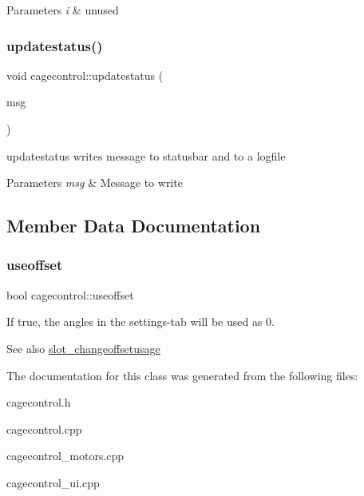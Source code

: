 \begin{DoxyParams}{Parameters}
{\em i} & unused \\
\hline
\end{DoxyParams}
\mbox{\label{classcagecontrol_aab3dedc2c4b814569988c93bd30546c7}} 
\subsubsection{\texorpdfstring{updatestatus()}{updatestatus()}}
{\footnotesize\ttfamily void cagecontrol\+::updatestatus (\begin{DoxyParamCaption}\item[{Q\+String}]{msg }\end{DoxyParamCaption})\hspace{0.3cm}{\ttfamily [private]}}



updatestatus writes message to statusbar and to a logfile 


\begin{DoxyParams}{Parameters}
{\em msg} & Message to write \\
\hline
\end{DoxyParams}


\subsection{Member Data Documentation}
\mbox{\label{classcagecontrol_aaae4d96e61ebe50baf65014003208ac0}} 
\subsubsection{\texorpdfstring{useoffset}{useoffset}}
{\footnotesize\ttfamily bool cagecontrol\+::useoffset\hspace{0.3cm}{\ttfamily [private]}}



If true, the angles in the settings-\/tab will be used as \textquotesingle{}0\textquotesingle{}. 

\begin{DoxySeeAlso}{See also}
\hyperlink{classcagecontrol_a2e106a12191172da2780a3d7fe137041}{slot\+\_\+changeoffsetusage} 
\end{DoxySeeAlso}


The documentation for this class was generated from the following files\+:\begin{DoxyCompactItemize}
\item 
cagecontrol.\+h\item 
cagecontrol.\+cpp\item 
cagecontrol\+\_\+motors.\+cpp\item 
cagecontrol\+\_\+ui.\+cpp\end{DoxyCompactItemize}
